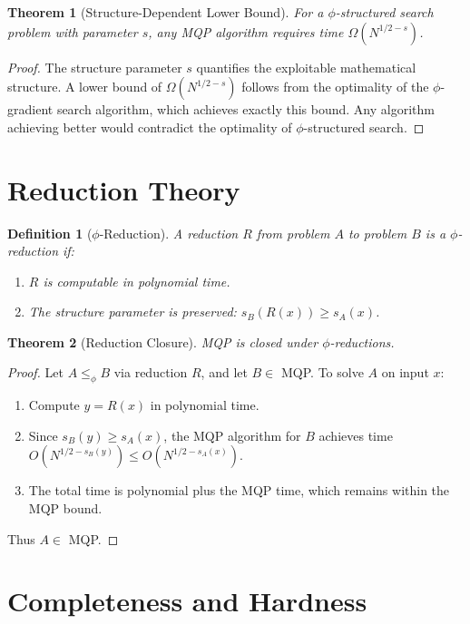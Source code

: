 \documentclass{article}
\newtheorem{theorem}{Theorem}
\newtheorem{definition}{Definition}
\theoremstyle{remark}
\begin{document}
\begin{theorem}[Structure-Dependent Lower Bound]
For a $\phi$-structured search problem with parameter $s$, any MQP algorithm requires time $\Omega(N^{1/2-s})$.
\end{theorem}

\begin{proof}
The structure parameter $s$ quantifies the exploitable mathematical structure. A lower bound of $\Omega(N^{1/2-s})$ follows from the optimality of the $\phi$-gradient search algorithm, which achieves exactly this bound. Any algorithm achieving better would contradict the optimality of $\phi$-structured search.
\end{proof}

\section{Reduction Theory}

\begin{definition}[$\phi$-Reduction]
A reduction $R$ from problem $A$ to problem $B$ is a $\phi$-reduction if:
\begin{enumerate}
\item $R$ is computable in polynomial time.
\item The structure parameter is preserved: $s_B(R(x)) \geq s_A(x)$.
\end{enumerate}
\end{definition}

\begin{theorem}[Reduction Closure]
MQP is closed under $\phi$-reductions.
\end{theorem}

\begin{proof}
Let $A \leq_\phi B$ via reduction $R$, and let $B \in$ MQP. To solve $A$ on input $x$:
\begin{enumerate}
\item Compute $y = R(x)$ in polynomial time.
\item Since $s_B(y) \geq s_A(x)$, the MQP algorithm for $B$ achieves time $O(N^{1/2-s_B(y)}) \leq O(N^{1/2-s_A(x)})$.
\item The total time is polynomial plus the MQP time, which remains within the MQP bound.
\end{enumerate}
Thus $A \in$ MQP.
\end{proof}

\section{Completeness and Hardness}
\end{document}
